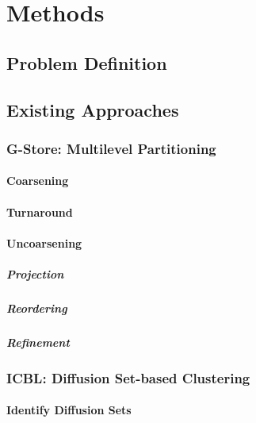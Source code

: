 \chapter{Methods}\label{\positionnumber} 

\section{Problem Definition}\label{\positionnumber}
\section{Existing Approaches}
    \subsection{G-Store: Multilevel Partitioning}\label{\positionnumber}
        \subsubsection{Coarsening}\label{\positionnumber}
        \subsubsection{Turnaround}\label{\positionnumber}
        \subsubsection{Uncoarsening}\label{\positionnumber}
            \paragraph{Projection}\label{\positionnumber}
            \paragraph{Reordering}\label{\positionnumber}
            \paragraph{Refinement}\label{\positionnumber}

    \subsection{ICBL: Diffusion Set-based Clustering}\label{\positionnumber}
        \subsubsection{Identify Diffusion Sets}\label{\positionnumber}
